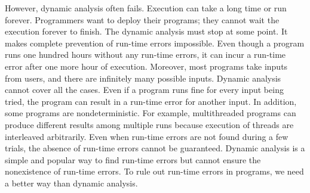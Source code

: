 However, dynamic analysis often fails. Execution can take
a long time or run forever. Programmers want to deploy their programs; they
cannot wait the execution forever to finish. The dynamic analysis must stop at some point.
It makes complete prevention of run-time errors impossible. Even though a
program runs one hundred hours without any run-time errors, it can incur
a run-time error after one more hour of execution. Moreover, most
programs take inputs from users, and there are infinitely many possible inputs.
Dynamic analysis cannot cover all the cases. Even if a program runs fine for every input
being tried, the program can result in a run-time error for another input.
In addition, some programs are nondeterministic. For example, multithreaded
programs can produce different results among multiple runs because execution of
threads are interleaved arbitrarily. Even when run-time errors are not found
during a few trials, the absence of run-time errors cannot be guaranteed.
Dynamic analysis is a simple and popular way to find run-time errors but cannot ensure
the nonexistence of run-time errors. To rule out run-time errors in programs, we
need a better way than dynamic analysis.

